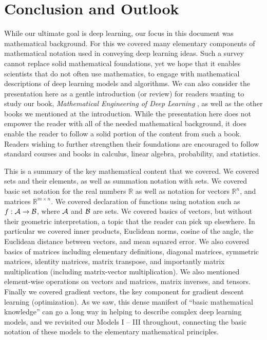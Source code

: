 \documentclass[12pt]{article}
\begin{document}
\section{Conclusion and Outlook}
\label{sec:conclusion}

While our ultimate goal is deep learning, our focus in this document was mathematical background. For this we covered many elementary components of mathematical notation used in conveying deep learning ideas. Such a survey cannot replace solid mathematical foundations, yet we hope that it enables scientists that do not often use mathematics, to engage with mathematical descriptions of deep learning models and algorithms. We can also consider the presentation here as a gentle introduction (or review) for readers wanting to study our book, {\em Mathematical Engineering of Deep Learning} \cite{LiquetMokaNazarathy2024DeepLearning}, as well as the other books we mentioned at the introduction. While the presentation here does not empower the reader with all of the needed mathematical background, it does enable the reader to follow a solid portion of the content from such a book. Readers wishing to further strengthen their foundations are encouraged to follow standard courses and books in calculus, linear algebra, probability, and statistics.\footnotemark{}


This is a summary of the key mathematical content that we covered. We covered sets and their elements, as well as summation notation with sets. We covered basic set notation for the real numbers ${\mathbb R}$ as well as notation for vectors ${\mathbb R}^n$, and matrices ${\mathbb R}^{m \times n}$. We covered declaration of functions using notation such as $f: {\cal A} \to {\cal B}$, where ${\cal A}$ and ${\cal B}$ are sets. We covered basics of vectors, but without their geometric interpretation, a topic that the reader can pick up elsewhere. In particular we covered inner products, Euclidean norms, cosine of the angle, the Euclidean distance between vectors, and mean squared error. We also covered basics of matrices including elementary definitions, diagonal matrices, symmetric matrices, identity matrices, matrix transpose, and importantly matrix multiplication (including matrix-vector multiplication). We also mentioned element-wise operations on vectors and matrices, matrix inverses, and tensors. Finally we covered gradient vectors, the key component for gradient descent learning (optimization). As we saw, this dense manifest of ``basic mathematical knowledge'' can go a long way in helping to describe complex deep learning models, and we revisited our Models I -- III throughout, connecting the basic notation of these models to the elementary mathematical principles.
\end{document}
